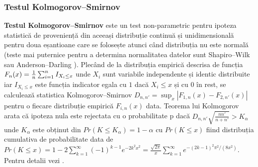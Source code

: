 \documentclass[12pt,draft]{article}
\begin{document}
\subsubsection{Testul Kolmogorov–Smirnov}
 \label{testKS}
 \textbf{Testul Kolmogorov–Smirnov} este un test non-parametric pentru ipoteza statistică de proveniență din aceeași distribuție continuă și unidimensională pentru doua eșantioane care se folosește atunci când distribuția nu este normală (teste mai puternice pentru a determina normalitatea datelor sunt  Shapiro–Wilk sau Anderson–Darling \citep{Stephens74} ). 
 Plecând de la distribuția empirică descrisa de funcția $F_n(x)={1 \over n}\sum_{i=1}^n I_{X_i\leq x}$ unde $X_i$ sunt variabile independente și identic distribuite iar $I_{X_i\leq x}$ este funcția indicator egala cu $1$ dacă $X_i\leq x$ și cu $0$ în rest, se calculează statistica Kolmogorov–Smirnov $D_{n,n'}=\sup_x |F_{1,n}(x)-F_{2,n'}(x)|$ pentru o fiecare distribuție empirică $F_{i,n}(x)$ data. 
 Teorema lui Kolmogorov arata că ipoteza nula este rejectata cu o probabilitate p dacă $D_{n,n'}\sqrt{\frac{n n'}{n + n'}}>K_\alpha$ unde $K_\alpha$ este obținut din $Pr(K\leq K_\alpha)=1-\alpha$ cu $Pr(K\leq x)$ fiind distribuția cumulativa de probabilitate data de $Pr(K\leq x)=1-2\sum_{k=1}^\infty (-1)^{k-1} e^{-2k^2 x^2}=\frac{\sqrt{2\pi}}{x}\sum_{k=1}^\infty e^{-(2k-1)^2\pi^2/(8x^2)}$. 
 Pentru detalii vezi \citep{stuart99}.
\end{document}
